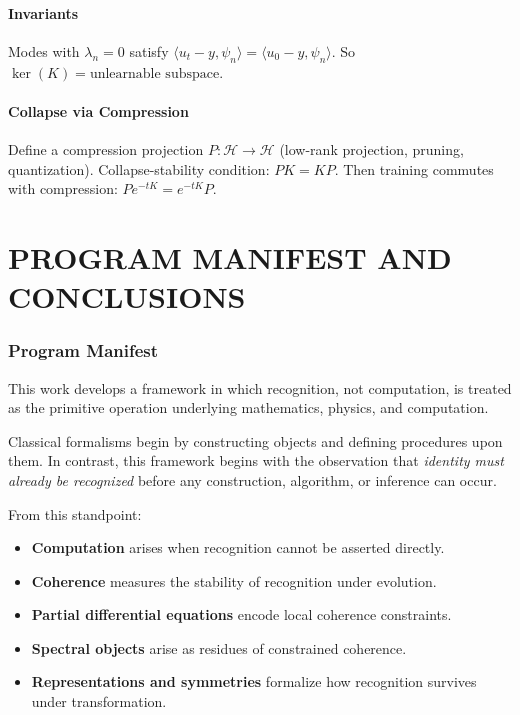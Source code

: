 \documentclass[12pt, oneside]{article}
\begin{document}
\subsection{Invariants}

Modes with $\lambda_n = 0$ satisfy $\langle u_t - y, \psi_n \rangle = \langle u_0 - y, \psi_n \rangle$. So $\ker(K) = \text{unlearnable subspace}$.

\subsection{Collapse via Compression}

Define a compression projection $P: \mathcal{H} \rightarrow \mathcal{H}$ (low-rank projection, pruning, quantization). Collapse-stability condition: $PK = KP$. Then training commutes with compression: $Pe^{-tK} = e^{-tK}P$.

\newpage

\part{PROGRAM MANIFEST AND CONCLUSIONS}

\section{Program Manifest}

This work develops a framework in which recognition, not computation, is treated as the primitive operation underlying mathematics, physics, and computation.

Classical formalisms begin by constructing objects and defining procedures upon them. In contrast, this framework begins with the observation that \emph{identity must already be recognized} before any construction, algorithm, or inference can occur.

From this standpoint:
\begin{itemize}
    \item \textbf{Computation} arises when recognition cannot be asserted directly.
    \item \textbf{Coherence} measures the stability of recognition under evolution.
    \item \textbf{Partial differential equations} encode local coherence constraints.
    \item \textbf{Spectral objects} arise as residues of constrained coherence.
    \item \textbf{Representations and symmetries} formalize how recognition survives under transformation.
\end{itemize}
\end{document}
